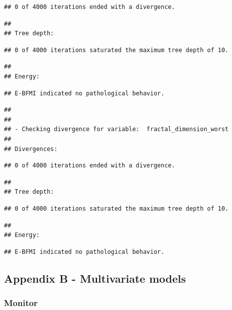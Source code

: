 \documentclass[
]{article}
\begin{document}
\begin{verbatim}
## 0 of 4000 iterations ended with a divergence.
\end{verbatim}

\begin{verbatim}
## 
## Tree depth:
\end{verbatim}

\begin{verbatim}
## 0 of 4000 iterations saturated the maximum tree depth of 10.
\end{verbatim}

\begin{verbatim}
## 
## Energy:
\end{verbatim}

\begin{verbatim}
## E-BFMI indicated no pathological behavior.
\end{verbatim}

\begin{verbatim}
## 
## 
## - Checking divergence for variable:  fractal_dimension_worst 
## 
## Divergences:
\end{verbatim}

\begin{verbatim}
## 0 of 4000 iterations ended with a divergence.
\end{verbatim}

\begin{verbatim}
## 
## Tree depth:
\end{verbatim}

\begin{verbatim}
## 0 of 4000 iterations saturated the maximum tree depth of 10.
\end{verbatim}

\begin{verbatim}
## 
## Energy:
\end{verbatim}

\begin{verbatim}
## E-BFMI indicated no pathological behavior.
\end{verbatim}

\hypertarget{apb}{%
\subsection{Appendix B - Multivariate models}\label{apb}}

\hypertarget{monitor-1}{%
\subsubsection{Monitor}\label{monitor-1}}
\end{document}
